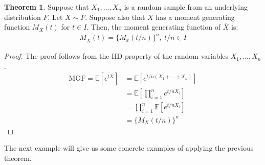 \documentclass[11pt]{scrartcl}
\theoremstyle{definition}
\newtheorem{theorem}{Theorem}
\theoremstyle{remark}
\newcommand{\EX}[1]{\mathbb{E}\left[#1 \right]}
\begin{document}
\begin{theorem}
	Suppose that $X_1, ..., X_n$ is a random sample from an underlying distribution $F$. Let $X \sim F$. Suppose also that $X$ has a moment generating function $M_X(t)$ for $t \in I$. Then, the moment generating function of $\overline{X}$ is: 
	\begin{align}
		M_{\overline{X}} (t) = \{ M_x(t/n) \}^n,\ t/n \in I 
	\end{align}
\end{theorem}

\begin{proof} The proof follows from the IID property of the random variables $X_1, ..., X_n$. 
	\begin{align*}
	\text{MGF} = \EX{e^{t\overline{X}}} & =	\EX{e^{t/n (X_1 + ... + X_n)}} \\
						& = \EX{\prod_{i=1}^n e^{t/n X_i}} \\
						& = \prod_{i=1}^n \EX{ e^{t/n X_i }} \\
						& = \{ M_X(t/n) \}^n 
	\end{align*}
\end{proof}

The next example will give us some concrete examples of applying the previous theorem. 
\end{document}
